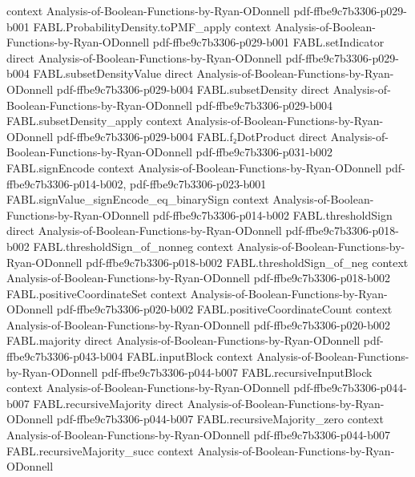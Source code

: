 \begin{theorem}
  {context}
  {Analysis-of-Boolean-Functions-by-Ryan-ODonnell}
  {pdf-ffbe9c7b3306-p029-b001}
\proofstep
  {FABL.ProbabilityDensity.toPMF_apply}
  {context}
  {Analysis-of-Boolean-Functions-by-Ryan-ODonnell}
  {pdf-ffbe9c7b3306-p029-b001}
\proofstep
  {FABL.setIndicator}
  {direct}
  {Analysis-of-Boolean-Functions-by-Ryan-ODonnell}
  {pdf-ffbe9c7b3306-p029-b004}
\proofstep
  {FABL.subsetDensityValue}
  {direct}
  {Analysis-of-Boolean-Functions-by-Ryan-ODonnell}
  {pdf-ffbe9c7b3306-p029-b004}
\proofstep
  {FABL.subsetDensity}
  {direct}
  {Analysis-of-Boolean-Functions-by-Ryan-ODonnell}
  {pdf-ffbe9c7b3306-p029-b004}
\proofstep
  {FABL.subsetDensity_apply}
  {context}
  {Analysis-of-Boolean-Functions-by-Ryan-ODonnell}
  {pdf-ffbe9c7b3306-p029-b004}
\proofstep
  {FABL.f₂DotProduct}
  {direct}
  {Analysis-of-Boolean-Functions-by-Ryan-ODonnell}
  {pdf-ffbe9c7b3306-p031-b002}
\proofstep
  {FABL.signEncode}
  {context}
  {Analysis-of-Boolean-Functions-by-Ryan-ODonnell}
  {pdf-ffbe9c7b3306-p014-b002,
    pdf-ffbe9c7b3306-p023-b001}
\proofstep
  {FABL.signValue_signEncode_eq_binarySign}
  {context}
  {Analysis-of-Boolean-Functions-by-Ryan-ODonnell}
  {pdf-ffbe9c7b3306-p014-b002}
\proofstep
  {FABL.thresholdSign}
  {direct}
  {Analysis-of-Boolean-Functions-by-Ryan-ODonnell}
  {pdf-ffbe9c7b3306-p018-b002}
\proofstep
  {FABL.thresholdSign_of_nonneg}
  {context}
  {Analysis-of-Boolean-Functions-by-Ryan-ODonnell}
  {pdf-ffbe9c7b3306-p018-b002}
\proofstep
  {FABL.thresholdSign_of_neg}
  {context}
  {Analysis-of-Boolean-Functions-by-Ryan-ODonnell}
  {pdf-ffbe9c7b3306-p018-b002}
\proofstep
  {FABL.positiveCoordinateSet}
  {context}
  {Analysis-of-Boolean-Functions-by-Ryan-ODonnell}
  {pdf-ffbe9c7b3306-p020-b002}
\proofstep
  {FABL.positiveCoordinateCount}
  {context}
  {Analysis-of-Boolean-Functions-by-Ryan-ODonnell}
  {pdf-ffbe9c7b3306-p020-b002}
\proofstep
  {FABL.majority}
  {direct}
  {Analysis-of-Boolean-Functions-by-Ryan-ODonnell}
  {pdf-ffbe9c7b3306-p043-b004}
\proofstep
  {FABL.inputBlock}
  {context}
  {Analysis-of-Boolean-Functions-by-Ryan-ODonnell}
  {pdf-ffbe9c7b3306-p044-b007}
\proofstep
  {FABL.recursiveInputBlock}
  {context}
  {Analysis-of-Boolean-Functions-by-Ryan-ODonnell}
  {pdf-ffbe9c7b3306-p044-b007}
\proofstep
  {FABL.recursiveMajority}
  {direct}
  {Analysis-of-Boolean-Functions-by-Ryan-ODonnell}
  {pdf-ffbe9c7b3306-p044-b007}
\proofstep
  {FABL.recursiveMajority_zero}
  {context}
  {Analysis-of-Boolean-Functions-by-Ryan-ODonnell}
  {pdf-ffbe9c7b3306-p044-b007}
\proofstep
  {FABL.recursiveMajority_succ}
  {context}
  {Analysis-of-Boolean-Functions-by-Ryan-ODonnell}

\end{theorem}
